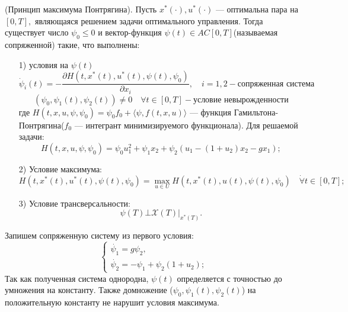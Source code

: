 \documentclass[11pt]{article}
\begin{document}
	\begin{theorem}
		{(Принцип максимума Понтрягина). Пусть $x^*(\cdot), u^*(\cdot)$ --- оптимальна пара на $[0,T],$ являющаяся решением задачи оптимального управления. Тогда существует число $\psi_0 \leq 0$ и вектор-функция $\psi(t) \in AC[0,T]$(называемая сопряженной) такие, что выполнены:}
		\begin{itemize}
			\item [1)]{условия на $\psi(t)$ \[ \dot{\psi}_i(t) = -\frac{\partial H(t,x^*(t), u^*(t),\psi(t),\psi_0)}{\partial x_i}, \quad i = 1,2 - \text{сопряженная система} \]
			\[ (\psi_0, \psi_1(t), \psi_2(t)) \neq 0 \quad \forall t \in [0,T] - \text{условие невырожденности} \]
			{где $H(t,x,u,\psi,\psi_0) = \psi_0f_0 + \langle \psi, f(t,x,u) \rangle$ --- функция Гамильтона-Понтрягина($f_0$ --- интегрант минимизируемого функционала). Для решаемой задачи:
			\[ H(t,x,u,\psi,\psi_0) = \psi_0 u_1^2 + \psi_1x_2 + \psi_2(u_1 - (1 + u_2)x_2 - gx_1); \]}	
		}
			\item [2)]{Условие максимума:
		\[ H(t,x^*(t),u^*(t),\psi(t),\psi_0) = \underset{u \in U}{\max}H(t,x^*(t),u(t),\psi(t),\psi_0) \quad \dot{\forall} t \in [0,T]; \]	
		}
			\item [3)]{Условие трансверсальности:
		\[ \psi(T) \bot \mathcal{X}(T)|_{x^*(T)}. \]	
		}
		\end{itemize}
	\end{theorem}
	{Запишем сопряженную систему из первого условия:}
	\begin{equation}
	\begin{cases}
	\dot{\psi_1} = g\psi_2,	\\
	\dot{\psi_2} = -\psi_1 + \psi_2(1 + u_2);
	\end{cases}
	\end{equation}	
	{Так как полученная система однородна, $\psi(t)$ определяется с точностью до умножения на константу. Также домножение ($\psi_0,\psi_1(t),\psi_2(t)$) на положительную константу не нарушит условия максимума.}
	
\end{document}
